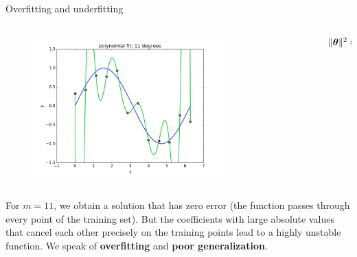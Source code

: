\documentclass[xcolor=pdftex,dvipsnames,table]{beamer}
\begin{document}
\begin{frame}{Overfitting and underfitting}
\begin{columns}
\begin{column}{.8\textwidth}
\begin{figure}[htb]
	\includegraphics[width=0.75\textwidth]{../graphics/polyfit_degree_11.png}
\end{figure}
\end{column}
\begin{column}{.2\textwidth}
$\| \boldsymbol{\theta} \|^2 \approx 10^7$
\end{column}
\end{columns}
For $m=11$, we obtain a solution that has zero error (the function passes through every point of the training set). But the coefficients with large absolute values that cancel each other precisely on the training points lead to a highly unstable function. We speak of \textbf{overfitting} and \textbf{poor generalization}.
\end{frame}
\end{document}
